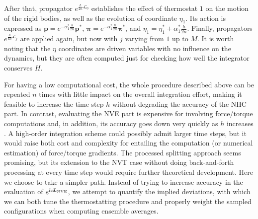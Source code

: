 \documentclass[
journal=jctcce,
layout=twocolumn
]{achemso}
\newcommand{\vt}[1]{\boldsymbol{\mathbf{#1}}}   %
\newcommand{\Liu}[1]{i\!L_\text{#1}}            %
\newcommand{\timestep}{h}
\newcommand{\modified}[1]{\widetilde{#1}}
\begin{document}
After that, propagator $e^{\frac{\timestep}{2n} \mathcal{L}_0}$ establishes the effect of thermostat $1$ on the motion of the rigid bodies, as well as the evolution of coordinate $\eta_1$. Its action is expressed as ${\vt p} = e^{-\alpha_1^\ast \frac{\timestep}{2n}} {\vt p}^\ast$, ${\vt \pi} = e^{-\alpha_1^\ast \frac{\timestep}{2n}} {\vt \pi}^\ast$, and $\eta_1 = \eta_1^\ast + \alpha_1^\ast \frac{\timestep}{2n}$.
Finally, propagators $e^{\frac{\timestep}{4n} \mathcal{L}_j}$ are applied again, but now with $j$ varying from $1$ up to $M$. It is worth noting that the $\eta$ coordinates are driven variables with no influence on the dynamics, but they are often computed just for checking how well the integrator conserves $H$.

For having a low computational cost, the whole procedure described above can be repeated $n$ times with little impact on the overall integration effort, making it feasible to increase the time step $\timestep$ without degrading the accuracy of the NHC part. In contrast, evaluating the NVE part is expensive for involving force/torque computations and, in addition, its accuracy goes down very quickly as $\timestep$ increases \cite{Davidchack_2010, Silveira_2017}. A high-order integration scheme\cite{Omelyan_2007, Van_zon_2008} could possibly admit larger time steps, but it would raise both cost and complexity for entailing the computation (or numerical estimation) of force/torque gradients. The processed splitting approach \cite{Omelyan_2008} seems promising, but its extension to the NVT case without doing back-and-forth processing at every time step would require further theoretical development. Here we choose to take a simpler path. Instead of trying to increase accuracy in the evaluation of $e^{\timestep \Liu{\tiny NVE}}$, we attempt to quantify the implied deviations, with which we can both tune the thermostatting procedure and properly weight the sampled configurations when computing ensemble averages.
\end{document}
